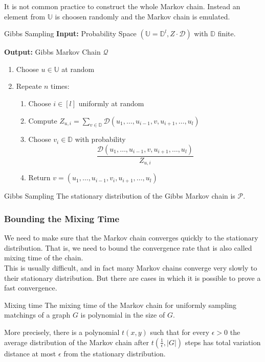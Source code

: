 \documentclass[english]{panikzettel}
\begin{document}
It is not common practice to construct the whole Markov chain. Instead an element from $\mathbb{U}$ is choosen randomly and the Markov chain is emulated.

\begin{algo}{Gibbs Sampling}
\textbf{Input:} Probability Space $(\mathbb{U} = \mathbb{D}^l, Z \cdot \mathcal{D})$ with $\mathbb{D}$ finite.

\textbf{Output:} Gibbs Markov Chain $\mathcal{Q}$
\tcblower
\begin{enumerate}
\item Choose $u \in \mathbb{U}$ at random
\item Repeate $n$ times:
\begin{enumerate}
    \item Choose $i \in [l]$ uniformly at random
    \item Compute $Z_{u,i} = \sum_{v \in \mathbb{D}} \mathcal{D}(u_1, \ldots, u_{i-1}, v, u_{i+1}, \ldots, u_l)$
    \item Choose $v_i \in \mathbb{D}$ with probability
$$
\frac{\mathcal{D}(u_1, \ldots, u_{i-1}, v, u_{i+1}, \ldots, u_l)}{Z_{u,i}}
$$
    \item Return $v = (u_1, \ldots, u_{i-1}, v_i, u_{i+1}, \ldots, u_l)$
\end{enumerate}
\end{enumerate}
\end{algo}

\begin{theo}{Gibbs Sampling}
The stationary distribution of the Gibbs Markov chain is $\mathcal{P}$.
\end{theo}

\subsubsection{Bounding the Mixing Time}
We need to make sure that the Markov chain converges quickly to the stationary distribution.
That is, we need to bound the convergence rate that is also called mixing time of the chain.\\
This is usually difficult, and in fact many Markov chains converge very slowly to their stationary distribution. But there are cases in which it is possible to prove a fast convergence.


\begin{theo}{Mixing time}
The mixing time of the Markov chain for uniformly sampling matchings of a graph $G$ is polynomial in the size of $G$.

More precisely, there is a polynomial $t(x, y)$ such that for every $\epsilon>0$ the average distribution of the Markov chain after $t(\frac{1}{\epsilon}, |G|)$ steps has
total variation distance at most $\epsilon$ from the stationary distribution.
\end{theo}
\end{document}
